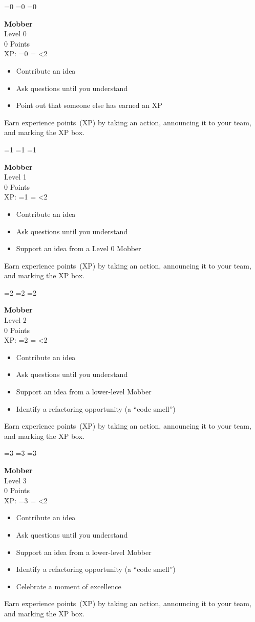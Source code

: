 \documentclass[20pt]{extarticle}
\makeatletter
\newcommand{\myrepeat}[2]{%
  \begingroup
  \my@repeat@count=\z@
  \@whilenum\my@repeat@count<#1\do{#2\advance\my@repeat@count\@ne}%
  \endgroup
}
\makeatother
\begin{document}
\newenvironment{role}[2]
{
  \begin{centering}
    \ifnum0=#2 \newcommand{\xp}{2} \newcommand{\score}{0 Points}
    \else \ifnum1=#2 \newcommand{\xp}{3} \newcommand{\score}{20 Points} 
      \else \ifnum2=#2 \newcommand{\xp}{4} \newcommand{\score}{30 Points}
        \else \newcommand{\xp}{0} \newcommand{\score}{35 Points + 1 per XP}
        \fi
      \fi
    \fi
      
    \textbf{\large{#1}}\\
    Level #2\\
    \score{}\\
  XP: \ifnum3=#2 \else \myrepeat{\xp}{$\square$} \fi
\end{centering}
\begin{itemize}
}
{
  \end{itemize}
  \vfill Earn experience points~(XP) by taking an action,
    \mbox{announcing} %
    it to your team, and marking the XP box.
  \pagebreak
}

\begin{role}{Mobber}{0}
  \item Contribute an idea
  \item Ask questions until you understand
  \item Point out that someone else has earned an XP
\end{role}

\begin{role}{Mobber}{1}
  \item Contribute an idea
  \item Ask questions until you understand
  \item Support an idea from a Level 0 Mobber
\end{role}

\begin{role}{Mobber}{2}
  \item Contribute an idea
  \item Ask questions until you understand
  \item Support an idea from a lower-level Mobber
  \item Identify a refactoring opportunity (a ``code smell'')
\end{role}

\begin{role}{Mobber}{3}
  \item Contribute an idea
  \item Ask questions until you understand
  \item Support an idea from a lower-level Mobber
  \item Identify a refactoring opportunity (a ``code smell'')
  \item Celebrate a moment of excellence
\end{role}
\end{document}
